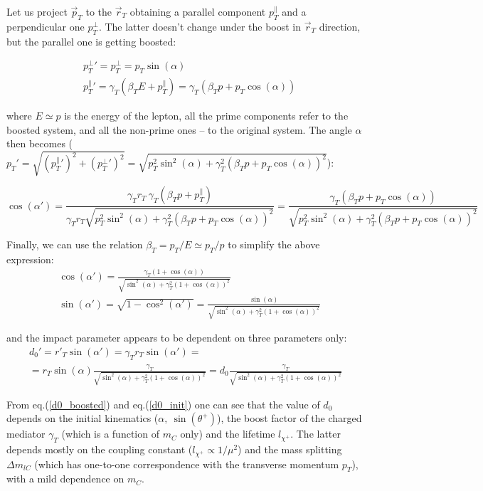 \documentclass[12pt,letterpaper,notitlepage]{article}
\begin{document}
Let us project $\vec{p}_T$ to the $\vec{r}_T$ obtaining a parallel component $p_T^\parallel$ and a perpendicular one $p_T^\bot$. The latter doesn't change under the boost in $\vec{r}_T$ direction, but the parallel one is getting boosted:

\begin{align}
  &p_T^\bot '=p_T^\bot=p_T \sin(\alpha)\\
  &p_T^\parallel '=\gamma_T(\beta_T E+p_T^\parallel)=\gamma_T(\beta_T p+p_T \cos(\alpha))
\end{align}

where $E\simeq p$ is the energy of the lepton, all the prime components refer to the boosted system, and all the non-prime ones -- to the original system. The angle $\alpha$ then becomes ($p_T'=\sqrt{(p_T^\parallel')^2+(p_T^\bot')^2}=\sqrt{p_T^2 \sin^2(\alpha)+\gamma_T^2(\beta_T p+p_T \cos(\alpha))^2}$):

\begin{equation}
  \cos(\alpha')=\frac{\gamma_T r_T\ \gamma_T(\beta_T p+p_T^\parallel)}{\gamma_T r_T \sqrt{p_T^2 \sin^2(\alpha)+\gamma_T^2(\beta_T p+p_T \cos(\alpha))^2}}=\frac{\gamma_T(\beta_T p+p_T \cos(\alpha))}{\sqrt{p_T^2 \sin^2(\alpha)+\gamma_T^2(\beta_T p+p_T \cos(\alpha))^2}}
\end{equation}

Finally, we can use the relation $\beta_T=p_T/E\simeq p_T/p$ to simplify the above expression:
\begin{align} \label{alpha_boosted}
  &\cos(\alpha')=\frac{\gamma_T(1+\cos(\alpha))}{\sqrt{\sin^2(\alpha)+\gamma_T^2(1+ \cos(\alpha))^2}}\\
  &\sin(\alpha')=\sqrt{1-\cos^2(\alpha')}=\frac{\sin(\alpha)}{\sqrt{\sin^2(\alpha)+\gamma_T^2(1+ \cos(\alpha))^2}}
\end{align}

and the impact parameter appears to be dependent on three parameters only:
\begin{multline}\label{d0_boosted}
  d_0'=r'_T \sin(\alpha')=\gamma_T r_T \sin(\alpha')=\\=r_T \sin(\alpha) \frac{\gamma_T}{\sqrt{\sin^2(\alpha)+\gamma_T^2(1+\cos(\alpha))^2}}= d_0 \frac{\gamma_T}{\sqrt{\sin^2(\alpha)+\gamma_T^2(1+\cos(\alpha))^2}}
\end{multline}

From eq.(\ref{d0_boosted}) and eq.(\ref{d0_init}) one can see that the value of $d_0$ depends on the initial kinematics ($\alpha,\ \sin(\theta^+)$), the boost factor of the charged mediator $\gamma_T$ (which is a function of $m_C$ only) and the lifetime $l_{\chi^+}$. The latter depends mostly on the coupling constant ($l_{\chi^+} \propto 1/\mu^2$) and the mass splitting $\Delta m_{lC}$ (which has one-to-one correspondence with the transverse momentum $p_T$), with a mild dependence on $m_C$.
\end{document}

